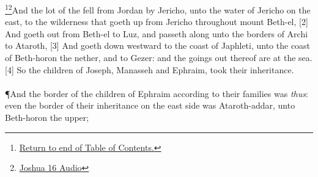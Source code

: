 \footnote{\textcolor[cmyk]{0.99998,1,0,0}{\hyperlink{TOC}{Return to end of Table of Contents.}}}\footnote{\href{https://audiobible.com/bible/joshua_16.html}{\textcolor[cmyk]{0.99998,1,0,0}{Joshua 16 Audio}}}\textcolor[cmyk]{0.99998,1,0,0}{And the lot of the  fell from Jordan by Jericho, unto the water of Jericho on the east, to the wilderness that goeth up from Jericho throughout mount Beth-el,} %
[2] \textcolor[cmyk]{0.99998,1,0,0}{And goeth out from Beth-el to Luz, and passeth along unto the borders of Archi to Ataroth,} %
[3] \textcolor[cmyk]{0.99998,1,0,0}{And goeth down westward to the coast of Japhleti, unto the coast of Beth-horon the nether, and to Gezer: and the goings out thereof are at the sea.}
[4] \textcolor[cmyk]{0.99998,1,0,0}{So the children of Joseph, Manasseh and Ephraim, took their inheritance.}\\
\\
\P \textcolor[cmyk]{0.99998,1,0,0}{And the border of the children of Ephraim according to their families was \emph{thus}: even the border of their inheritance on the east side was Ataroth-addar, unto Beth-horon the upper;}
